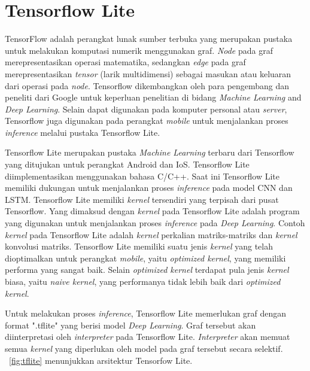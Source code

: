 \section{Tensorflow Lite}
TensorFlow \cite{tensorflow} adalah perangkat lunak sumber terbuka yang merupakan pustaka untuk melakukan komputasi numerik menggunakan graf. \textit{Node} pada graf merepresentasikan operasi matematika, sedangkan \textit{edge} pada graf merepresentasikan \textit{tensor} (larik multidimensi) sebagai masukan atau keluaran dari operasi pada \textit{node}. Tensorflow dikembangkan oleh para pengembang dan peneliti dari Google untuk keperluan penelitian di bidang \textit{Machine Learning} and \textit{Deep Learning}. Selain dapat digunakan pada komputer personal atau \textit{server}, Tensorflow juga digunakan pada perangkat \textit{mobile} untuk menjalankan proses \textit{inference} melalui pustaka Tensorflow Lite.

Tensorflow Lite \cite{tflite} merupakan pustaka \textit{Machine Learning} terbaru dari Tensorflow yang ditujukan untuk perangkat Android dan IoS. Tensorflow Lite diimplementasikan menggunakan bahasa C/C++. Saat ini Tensorflow Lite memiliki dukungan untuk menjalankan proses \textit{inference} pada model CNN dan LSTM. Tensorflow Lite memiliki \textit{kernel} tersendiri yang terpisah dari pusat Tensorflow. Yang dimaksud dengan \textit{kernel} pada Tensorflow Lite adalah program yang digunakan untuk menjalankan proses \textit{inference} pada \textit{Deep Learning}. Contoh \textit{kernel} pada Tensorflow Lite adalah \textit{kernel} perkalian matriks-matriks dan \textit{kernel} konvolusi matriks. Tensorflow Lite memiliki suatu jenis \textit{kernel} yang telah dioptimalkan untuk perangkat \textit{mobile}, yaitu \textit{optimized kernel}, yang memiliki performa yang sangat baik. Selain \textit{optimized kernel} terdapat pula jenis \textit{kernel} biasa, yaitu \textit{naive kernel}, yang performanya tidak lebih baik dari \textit{optimized kernel}.

Untuk melakukan proses \textit{inference}, Tensorflow Lite memerlukan graf dengan format ".tflite" yang berisi model \textit{Deep Learning}. Graf tersebut akan diinterpretasi oleh \textit{interpreter} pada Tensorflow Lite. \textit{Interpreter} akan memuat semua \textit{kernel} yang diperlukan oleh model pada graf tersebut secara selektif. \pic~\ref{fig:tflite} menunjukkan arsitektur Tensorfow Lite.

